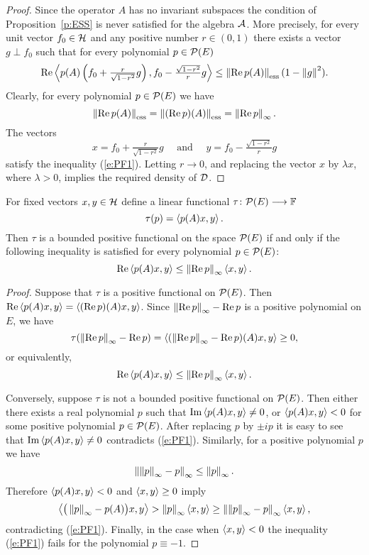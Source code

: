 \begin{proof}
Since the operator $A$ has no invariant subspaces the condition of
Proposition~\ref{p:ESS} is never satisfied for the algebra ${\cal A}$. More
precisely, for every unit vector $f_0\in{\cal H}$ and any positive number
$r\in(0,1)$ there exists a vector $g\perp{}f_0$ such that for every
polynomial $p\in{\cal{P}}(E)$
\[ \RE\seq{p(A)\left(f_0+\tfrac{r}{\sqrt{1-r^2}}g\right),
                  f_0-\tfrac{\sqrt{1-r^2}}{r}g} \leq
   \essnorm{\RE{}p(A)}(1 - \norm{g}^2). \]
Clearly, for every polynomial $p\in{\cal{P}}(E)$ we have
\[ \essnorm{\RE p(A)} = \essnorm{(\RE p)(A)} = \norm{\RE p}_\infty. \]
The vectors
\[ x=f_0+\tfrac{r}{\sqrt{1-r^2}}g
   \quad \text{ and } \quad
   y=f_0-\tfrac{\sqrt{1-r^2}}{r}g \]
satisfy the inequality (\ref{e:PF1}). Letting $r\to0$, and replacing the
vector $x$ by $\lambda{x}$, where $\lambda>0$, implies the required density
of ${\cal{D}}$.
\end{proof}

\begin{lem} \label{l:PF2}
For fixed vectors $x,y\in{\cal H}$ define a linear functional
$\tau\colon{\cal{P}}(E)\longrightarrow\mathbb F$
\[ \tau(p) = \left<p(A)x,y\right>. \]
Then $\tau$ is a bounded positive functional on the space ${\cal{P}}(E)$ if and only
if the following inequality is satisfied for every polynomial $p\in{\cal{P}}(E)$:
\[ \operatorname{Re}\left<p(A)x,y\right> \leq \left\Vert\operatorname{Re} p\right\Vert_\infty\left<x,y\right>. \]
\end{lem}

\begin{proof}
Suppose that $\tau$ is a positive functional on ${\cal{P}}(E)$. Then $\operatorname{Re}
\left<p(A)x,y\right> = \left<(\operatorname{Re} p)(A)x,y\right>$. Since $\left\Vert\operatorname{Re} p\right\Vert_\infty - \operatorname{Re} p$ is
a positive polynomial on $E$, we have
\[ \tau(\left\Vert\operatorname{Re} p\right\Vert_\infty - \operatorname{Re} p) =
   \left<(\left\Vert\operatorname{Re} p\right\Vert_\infty - \operatorname{Re} p)(A)x, y\right> \geq 0, \]
or equivalently,
\[ \operatorname{Re}\left<p(A)x,y\right> \leq \left\Vert\operatorname{Re} p\right\Vert_\infty\left<x,y\right>. \]

Conversely, suppose $\tau$ is not a bounded positive functional on ${\cal{P}}(E)$.
Then either there exists a real polynomial $p$ such that
$\operatorname{Im}\left<p(A)x,y\right>\neq0$, or $\left<p(A)x,y\right><0$ for some positive polynomial
$p\in{\cal{P}}(E)$. After replacing $p$ by $\pm i p$ it is easy to see that
$\operatorname{Im}\left<p(A)x,y\right>\neq0$ contradicts (\ref{e:PF1}). Similarly, for a positive
polynomial $p$ we have
\[ \left\Vert\left\Vert p\right\Vert_\infty-p\right\Vert_\infty \leq \left\Vert p\right\Vert_\infty. \]
Therefore $\left<p(A)x,y\right><0$ and $\left<x,y\right>\geq0$ imply
\[ \left< \big(\left\Vert p\right\Vert_\infty-p(A)\big)x,y\right> > \left\Vert p\right\Vert_\infty\left<x,y\right>
   \geq  \left\Vert\left\Vert p\right\Vert_\infty-p\right\Vert_\infty\left<x,y\right>, \]
contradicting (\ref{e:PF1}). Finally, in the case when $\left<x,y\right><0$ the
inequality (\ref{e:PF1}) fails for the polynomial $p\equiv-1$.
\end{proof}

